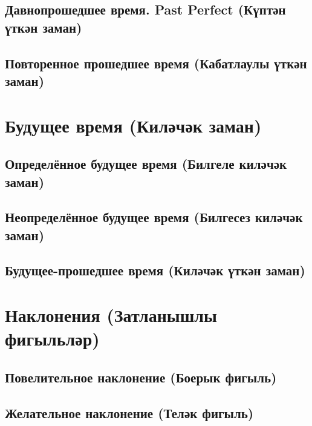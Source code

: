 



\subsection{Давнопрошедшее время. Past Perfect (Күптән үткән заман)}





\subsection{Повторенное прошедшее время (Кабатлаулы үткән заман)}

\section{Будущее время (Киләчәк заман)}
\subsection{Определённое будущее время (Билгеле киләчәк заман)}





\subsection{Неопределённое будущее время (Билгесез киләчәк заман)}





\subsection{Будущее-прошедшее время (Киләчәк үткән заман)}
\section{Наклонения (Затланышлы фигыльләр)}
\subsection{Повелительное наклонение (Боерык фигыль)}
\subsection{Желательное наклонение (Теләк фигыль)}
